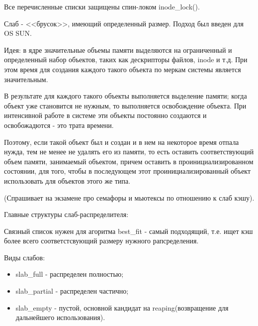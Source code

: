 \documentclass[12pt,a4paper]{scrreprt}
\begin{document}
Все перечисленные списки защищены спин-локом inode\_lock(). 

Слаб - <<брусок>>, имеющий определенный размер. Подход был введен для OS SUN. 

Идея: в ядре значительные объемы памяти выделяются на ограниченный и определенный набор объектов, таких как дескрипторы файлов, inode и т.д. При этом время для создания каждого такого объекта по меркам системы является значительным. 

В результате для каждого такого объекты выполняется выделение памяти; когда объект уже становится не нужным, то выполняется освобождение объекта. При интенсивной работе в системе эти объекты постоянно создаются и освобожадются - это трата времени.

Поэтому, если такой объект был и создан и в нем на некоторое время отпала нужда, тем не менее не удалять его из памяти, то есть оставить соответствующий объем памяти, занимаемый объектом, причем оставить в проинициализированном состоянии, для того, чтобы в последующем этот проинициализированный объект использовать для объектов этого же типа.

(Спрашивает на экзамене про семафоры и мьютексы по отношению к слаб кэшу).

Главные структуры слаб-распределителя:

\begin{figure}[!h]
\end{figure}

Связный список нужен для агоритма best\_fit - самый подходящий, т.е. ищет кэш более всего соответстсвующий размеру нужного рапсределения.

Виды слабов:

\begin{itemize}
	\item slab\_full - распределен полностью;
	\item slab\_partial - распределен частично;
	\item slab\_empty - пустой, основной кандидат на reaping(возвращение для дальнейшего использования).
\end{itemize}
\end{document}
